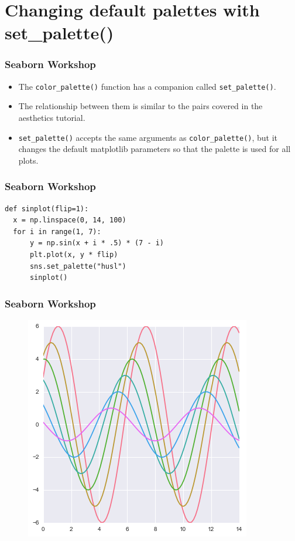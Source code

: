 \documentclass{beamer}
\begin{document}
\section{Changing default palettes with set\_palette()}
\begin{frame}[fragile]
\frametitle{Seaborn Workshop}
\large
\begin{itemize}
\item The \texttt{color\_palette()} function has a companion called \texttt{set\_palette()}. 
\item The relationship between them is similar to the pairs covered in the aesthetics tutorial. 
\item \texttt{set\_palette()} accepts the same arguments as \texttt{color\_palette()}, but it changes the default matplotlib parameters so that the palette is used for all plots.
\end{itemize}

\end{frame}
\begin{frame}[fragile]
	\frametitle{Seaborn Workshop}
	\Large
\begin{framed}
	\begin{verbatim}
def sinplot(flip=1):
  x = np.linspace(0, 14, 100)
  for i in range(1, 7):
      y = np.sin(x + i * .5) * (7 - i)
      plt.plot(x, y * flip)
      sns.set_palette("husl")
      sinplot()
	\end{verbatim}
\end{framed}

\end{frame}
\begin{frame}[fragile]
	\frametitle{Seaborn Workshop}
	\large
	
	
\begin{figure}
\centering
\includegraphics[width=0.7\linewidth]{images/color_palettes_67_0}
\end{figure}

\end{frame}
\end{document}
